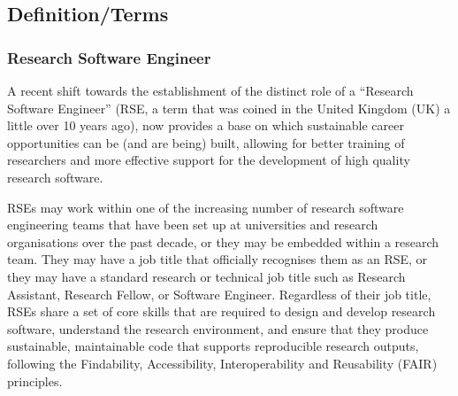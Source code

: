 \documentclass[
        english,biblatex
    ]{lni}
\begin{document}
    \subsection{Definition/Terms}\label{definitionterms}

    \subsubsection{Research Software
    Engineer}\label{research-software-engineer}

    A recent shift towards the establishment of the distinct role of a
    ``Research Software Engineer'' (RSE, a term that was coined in the
    United Kingdom (UK) a little over 10 years ago), now provides a base
    on which sustainable career opportunities can be (and are being)
    built, allowing for better training of researchers and more
    effective support for the development of high quality research
    software.

    RSEs may work within one of the increasing number of research
    software engineering teams that have been set up at universities and
    research organisations over the past decade, or they may be embedded
    within a research team. They may have a job title that officially
    recognises them as an RSE, or they may have a standard research or
    technical job title such as Research Assistant, Research Fellow, or
    Software Engineer. Regardless of their job title, RSEs share a set
    of core skills that are required to design and develop research
    software, understand the research environment, and ensure that they
    produce sustainable, maintainable code that supports reproducible
    research outputs, following the Findability, Accessibility,
    Interoperability and Reusability (FAIR) principles.
\end{document}
